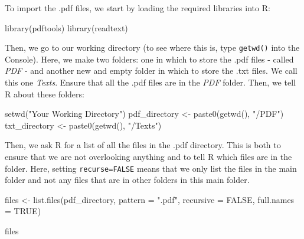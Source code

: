 \documentclass[
]{book}
\newenvironment{Shaded}{\begin{snugshade}}{\end{snugshade}}
\newcommand{\AttributeTok}[1]{\textcolor[rgb]{0.77,0.63,0.00}{#1}}
\newcommand{\ConstantTok}[1]{\textcolor[rgb]{0.00,0.00,0.00}{#1}}
\newcommand{\FunctionTok}[1]{\textcolor[rgb]{0.00,0.00,0.00}{#1}}
\newcommand{\NormalTok}[1]{#1}
\newcommand{\OtherTok}[1]{\textcolor[rgb]{0.56,0.35,0.01}{#1}}
\newcommand{\StringTok}[1]{\textcolor[rgb]{0.31,0.60,0.02}{#1}}
\begin{document}
To import the .pdf files, we start by loading the required libraries into R:

\begin{Shaded}
\begin{Highlighting}[]
\FunctionTok{library}\NormalTok{(pdftools)}
\FunctionTok{library}\NormalTok{(readtext)}
\end{Highlighting}
\end{Shaded}

Then, we go to our working directory (to see where this is, type \texttt{getwd()} into the Console). Here, we make two folders: one in which to store the .pdf files - called \emph{PDF} - and another new and empty folder in which to store the .txt files. We call this one \emph{Texts}. Ensure that all the .pdf files are in the \emph{PDF} folder. Then, we tell R about these folders:

\begin{Shaded}
\begin{Highlighting}[]
\FunctionTok{setwd}\NormalTok{(}\StringTok{"Your Working Directory"}\NormalTok{)}
\NormalTok{pdf\_directory }\OtherTok{\textless{}{-}} \FunctionTok{paste0}\NormalTok{(}\FunctionTok{getwd}\NormalTok{(), }\StringTok{"/PDF"}\NormalTok{)}
\NormalTok{txt\_directory }\OtherTok{\textless{}{-}} \FunctionTok{paste0}\NormalTok{(}\FunctionTok{getwd}\NormalTok{(), }\StringTok{"/Texts"}\NormalTok{)}
\end{Highlighting}
\end{Shaded}

Then, we ask R for a list of all the files in the .pdf directory. This is both to ensure that we are not overlooking anything and to tell R which files are in the folder. Here, setting \texttt{recurse=FALSE} means that we only list the files in the main folder and not any files that are in other folders in this main folder.

\begin{Shaded}
\begin{Highlighting}[]
\NormalTok{files }\OtherTok{\textless{}{-}} \FunctionTok{list.files}\NormalTok{(pdf\_directory, }\AttributeTok{pattern =} \StringTok{".pdf"}\NormalTok{, }\AttributeTok{recursive =} \ConstantTok{FALSE}\NormalTok{,}
    \AttributeTok{full.names =} \ConstantTok{TRUE}\NormalTok{)}

\NormalTok{files}
\end{Highlighting}
\end{Shaded}
\end{document}
